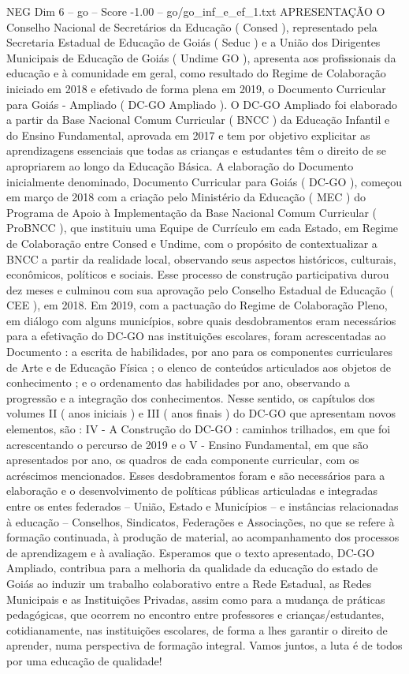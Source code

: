 \begin{textsample}{NEG Dim 6 – go – Score -1.00 – go/go\_inf\_e\_ef\_1.txt}  \label{ex:f6_neg_178}
APRESENTAÇÃO O Conselho Nacional de Secretários da Educação ( Consed ), representado pela Secretaria Estadual de Educação de Goiás ( Seduc ) e a União dos Dirigentes Municipais de Educação de Goiás ( Undime GO ), apresenta aos profissionais da educação e à comunidade em geral, como resultado do Regime de Colaboração iniciado em 2018 e efetivado de forma plena em 2019, o Documento Curricular para Goiás - Ampliado ( DC-GO Ampliado ).
O DC-GO Ampliado foi elaborado a partir da Base Nacional Comum Curricular ( BNCC ) da Educação Infantil e do Ensino Fundamental, aprovada em 2017 e tem por objetivo explicitar as aprendizagens essenciais que todas as crianças e estudantes têm o direito de se apropriarem ao longo da Educação Básica.
A elaboração do Documento inicialmente denominado, Documento Curricular para Goiás ( DC-GO ), começou em março de 2018 com a criação pelo Ministério da Educação ( MEC ) do Programa de Apoio à Implementação da Base Nacional Comum Curricular ( ProBNCC ), que instituiu uma Equipe de Currículo em cada Estado, em Regime de Colaboração entre Consed e Undime, com o propósito de contextualizar a BNCC a partir da realidade local, observando seus aspectos históricos, culturais, econômicos, políticos e sociais.
Esse processo de construção participativa durou dez meses e culminou com sua aprovação pelo Conselho Estadual de Educação ( CEE ), em 2018.
Em 2019, com a pactuação do Regime de Colaboração Pleno, em diálogo com alguns municípios, sobre quais desdobramentos eram necessários para a efetivação do DC-GO nas instituições escolares, foram acrescentadas ao Documento : a escrita de habilidades, por ano para os componentes curriculares de Arte e de Educação Física ; o elenco de conteúdos articulados aos objetos de conhecimento ; e o ordenamento das habilidades por ano, observando a progressão e a integração dos conhecimentos.
Nesse sentido, os capítulos dos volumes II ( anos iniciais ) e III ( anos finais ) do DC-GO que apresentam novos elementos, são : IV - A Construção do DC-GO : caminhos trilhados, em que foi acrescentando o percurso de 2019 e o V - Ensino Fundamental, em que são apresentados por ano, os quadros de cada componente curricular, com os acréscimos mencionados.
Esses desdobramentos foram e são necessários para a elaboração e o desenvolvimento de políticas públicas articuladas e integradas entre os entes federados – União, Estado e Municípios – e instâncias relacionadas à educação – Conselhos, Sindicatos, Federações e Associações, no que se refere à formação continuada, à produção de material, ao acompanhamento dos processos de aprendizagem e à avaliação.
Esperamos que o texto apresentado, DC-GO Ampliado, contribua para a melhoria da qualidade da educação do estado de Goiás ao induzir um trabalho colaborativo entre a Rede Estadual, as Redes Municipais e as Instituições Privadas, assim como para a mudança de práticas pedagógicas, que ocorrem no encontro entre professores e crianças/estudantes, cotidianamente, nas instituições escolares, de forma a lhes garantir o direito de aprender, numa perspectiva de formação integral.
Vamos juntos, a luta é de todos por uma educação de qualidade!

\end{textsample}
